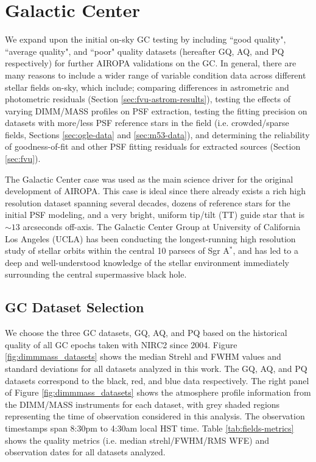 \documentclass[]{spie}  %
\begin{document}

\section{Galactic Center} \label{sec:gc-data}
We expand upon the initial on-sky GC testing \citep{Turri:inprep} by including ``good quality", ``average quality", and ``poor" quality datasets (hereafter GQ, AQ, and PQ respectively) for further AIROPA validations on the GC. In general, there are many reasons to include a wider range of variable condition data across different stellar fields on-sky, which include; comparing differences in astrometric and photometric residuals (Section \ref{sec:fvu-astrom-results}), testing the effects of varying DIMM/MASS profiles on PSF extraction, testing the fitting precision on datasets with more/less PSF reference stars in the field (i.e. crowded/sparse fields, Sections \ref{sec:ogle-data} and \ref{sec:m53-data}), and determining the reliability of goodness-of-fit and other PSF fitting residuals for extracted sources (Section \ref{sec:fvu}).

The Galactic Center case was used as the main science driver for the original development of AIROPA. This case is ideal since there already exists a rich high resolution dataset spanning several decades, dozens of reference stars for the initial PSF modeling, and a very bright, uniform tip/tilt (TT) guide star that is ${\sim}13$ arcseconds off-axis. The Galactic Center Group at University of California Los Angeles (UCLA) has been conducting the longest-running high resolution study of stellar orbits within the central 10 parsecs of Sgr A$^{*}$, and has led to a deep and well-understood knowledge of the stellar environment immediately surrounding the central supermassive black hole.

\subsection{GC Dataset Selection} \label{sec:gc-data-selection}
We choose the three GC datasets, GQ, AQ, and PQ based on the historical quality of all GC epochs taken with NIRC2 since 2004. Figure \ref{fig:dimmmass_datasets} shows the median Strehl and FWHM values and standard deviations for all datasets analyzed in this work. The GQ, AQ, and PQ datasets correspond to the black, red, and blue data respectively. The right panel of Figure \ref{fig:dimmmass_datasets} shows the atmosphere profile information from the DIMM/MASS instruments for each dataset, with grey shaded regions representing the time of observation considered in this analysis. The observation timestamps span 8:30pm to 4:30am local HST time. Table \ref{tab:fields-metrics} shows the quality metrics (i.e. median strehl/FWHM/RMS WFE) and observation dates for all datasets analyzed.
\end{document}
